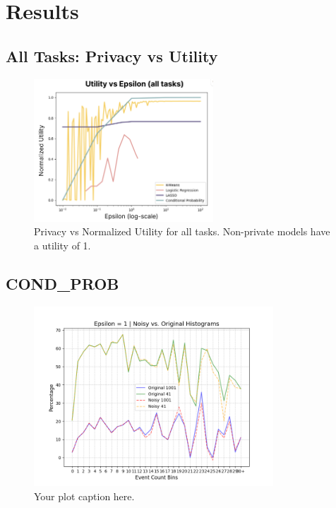 \documentclass[12pt,letterpaper]{article}
\begin{document}

\section{Results}

\subsection{All Tasks: Privacy vs Utility}

\begin{figure}[H] %
  \centering
  \includegraphics[width=0.6\textwidth]{figure/meta.png} %
  \caption{Privacy vs Normalized Utility for all tasks. Non-private models have a utility of 1.}
  \label{fig:meta}
\end{figure}

\subsection{COND\_PROB}

\begin{figure}[h!]
    \centering
    \includegraphics[width=0.8\textwidth]{report/figure/histoeps1.png}
    \caption{Your plot caption here.}
    \label{fig:yourplot}
\end{figure}
\end{document}
